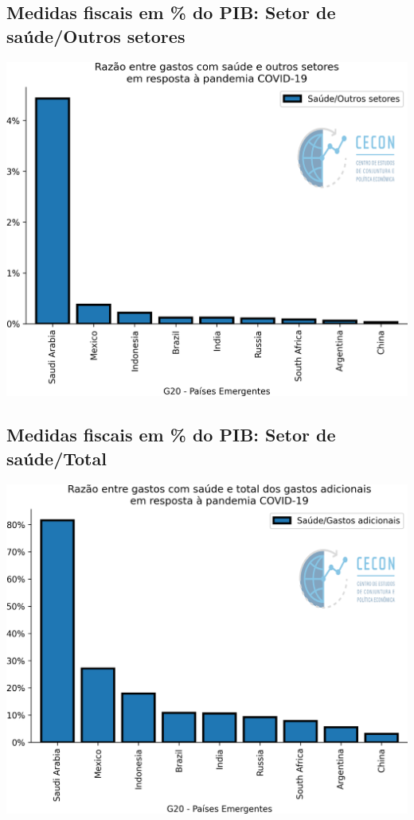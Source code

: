 \documentclass{SelfArx}
\begin{document}
\subsection*{Medidas fiscais em \% do PIB: Setor de saúde/Outros setores}
\label{sec:org7117dd6}

\begin{center}
\includegraphics[width=.9\linewidth]{./figs/IMF/FiscalMonitor_Covid_ratio.png}
\end{center}

\subsection*{Medidas fiscais em \% do PIB: Setor de saúde/Total}
\label{sec:org87b46f2}

\begin{center}
\includegraphics[width=.9\linewidth]{./figs/IMF/FiscalMonitor_Covid_total.png}
\end{center}
\end{document}
